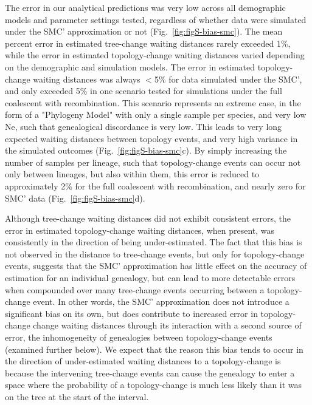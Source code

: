 \documentclass[11pt]{article}
\begin{document}
% 
The error in our analytical predictions was very low across all demographic
models and parameter settings tested, regardless of whether data were simulated
under the SMC' approximation or not
(Fig.~\ref{fig:figS-bias-smc}). 
% 
The mean percent error in estimated tree-change waiting distances 
rarely exceeded 1\%, while the error in estimated topology-change 
waiting distances varied depending on the demographic and simulation 
models.
% 
The error in estimated topology-change waiting distances was always
$<$5\% for data simulated under the SMC', and only exceeded 5\% in
one scenario tested for simulations under the full coalescent with
recombination. This scenario represents an extreme case, in the form of
a "Phylogeny Model" with only a single sample per species, and very low 
Ne, such that genealogical discordance is very low. This leads to very 
long expected waiting distances between topology events, and very high 
variance in the simulated outcomes (Fig.~\ref{fig:figS-bias-smc}c). 
By simply increasing the number of samples per lineage, such that 
topology-change events can occur not only between lineages, but also 
within them, this error is reduced to approximately 2\% for the full 
coalescent with recombination, and nearly zero for SMC' data 
(Fig.~\ref{fig:figS-bias-smc}d). 


Although tree-change waiting distances did not exhibit consistent errors,
the error in estimated topology-change waiting distances, when present,
was consistently in the direction of being under-estimated. The fact that
this bias is not observed in the distance to tree-change events, but only
for topology-change events, suggests that the SMC' approximation has
little effect on the accuracy of estimation for an individual genealogy,
but can lead to more detectable errors when compounded over many tree-change
events occurring between a topology-change event.
% 
In other words, the SMC' approximation does not introduce a significant
bias on its own, but does contribute to increased error in topology-change 
change waiting distances through its interaction with a second source of error,
the inhomogeneity of genealogies between topology-change events (examined
further below). 
% 
We expect that the reason this bias tends to occur in the direction
of under-estimated waiting distances to a topology-change is because 
the intervening tree-change events can cause the genealogy to enter a 
space where the probability of a topology-change is much less likely 
than it was on the tree at the start of the interval. 
% 
\end{document}
